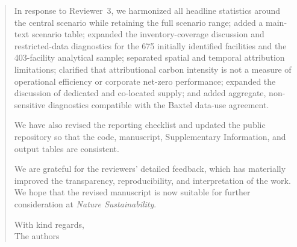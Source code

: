 \documentclass[11pt]{article}
\begin{document}
\begin{quote}
In response to Reviewer~3, we harmonized all headline statistics around the central scenario while retaining the full scenario range; added a main-text scenario table; expanded the inventory-coverage discussion and restricted-data diagnostics for the 675 initially identified facilities and the 403-facility analytical sample; separated spatial and temporal attribution limitations; clarified that attributional carbon intensity is not a measure of operational efficiency or corporate net-zero performance; expanded the discussion of dedicated and co-located supply; and added aggregate, non-sensitive diagnostics compatible with the Baxtel data-use agreement.

We have also revised the reporting checklist and updated the public repository so that the code, manuscript, Supplementary Information, and output tables are consistent.

We are grateful for the reviewers' detailed feedback, which has materially improved the transparency, reproducibility, and interpretation of the work. We hope that the revised manuscript is now suitable for further consideration at \textit{Nature Sustainability}.

With kind regards,\\
The authors
\end{quote}
\end{document}
